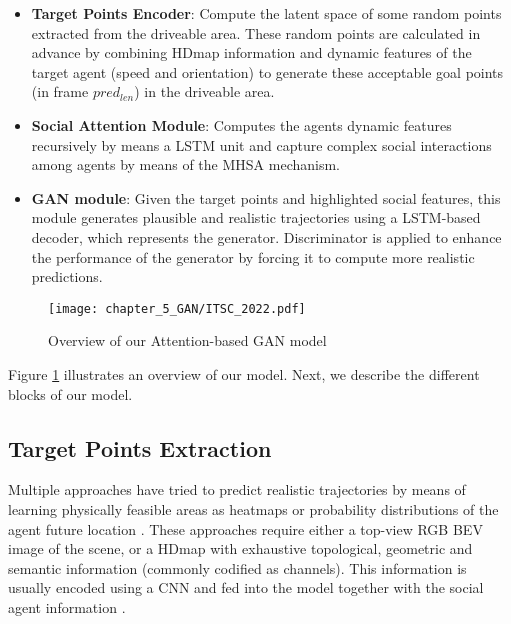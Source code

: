 \begin{itemize}
	
	\item \textbf{Target Points Encoder}: Compute the latent space of some random points extracted from the driveable area. These random points are calculated in advance by combining \ac{HDmap} information and dynamic features of the target agent (speed and orientation) to generate these acceptable goal points (in frame \textit{$pred_{len}$}) in the driveable area.
	
	\item \textbf{Social Attention Module}: Computes the agents dynamic features recursively by means a \ac{LSTM} unit and capture complex social interactions among agents by means of the \ac{MHSA} mechanism.
	
	\item \textbf{\ac{GAN} module}: Given the target points and highlighted social features, this module generates plausible and realistic trajectories using a \ac{LSTM}-based decoder, which represents the generator. Discriminator is applied to enhance the performance of the generator by forcing it to compute more realistic predictions.
	
\end{itemize} 

\begin{figure}[h] 
	\centering
	\texttt{[image: chapter\_5\_GAN/ITSC\_2022.pdf]}
	\caption{Overview of our Attention-based \ac{GAN} model}
	\label{fig:chapter_5_GAN/ITSC_2022}
\end{figure}

Figure \ref{fig:chapter_5_GAN/ITSC_2022} illustrates an overview of our model. Next, we describe the different blocks of our model.

\subsection{Target Points Extraction}
\label{subsec:5_target_points_extraction}

Multiple approaches have tried to predict realistic trajectories by means of learning physically feasible areas as heatmaps or probability distributions of the agent future location \cite{dendorfer2020goal, sadeghian2019sophie, gilles2021home}. These approaches require either a top-view RGB \ac{BEV} image of the scene, or a \ac{HDmap} with exhaustive topological, geometric and semantic information (commonly codified as channels). This information is usually encoded using a \ac{CNN} and fed into the model together with the social agent information \cite{dendorfer2020goal, sadeghian2019sophie, gao2020vectornet}.

